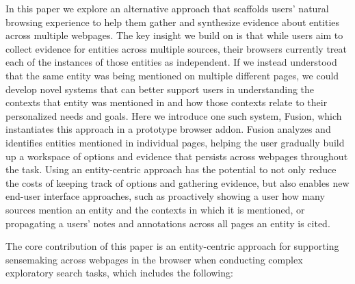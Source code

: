 In this paper we explore an alternative approach that scaffolds users' natural browsing experience to help them gather and synthesize evidence about entities across multiple webpages. The key insight we build on is that while users aim to collect evidence for entities across multiple sources, their browsers currently treat each of the instances of those entities as independent. If we instead understood that the same entity was being mentioned on multiple different pages, we could develop novel systems that can better support users in understanding the contexts that entity was mentioned in and how those contexts relate to their personalized needs and goals. Here we introduce one such system, Fusion, which instantiates this approach in a prototype browser addon. Fusion analyzes and identifies entities mentioned in individual pages, helping the user gradually build up a workspace of options and evidence that persists across webpages throughout the task. Using an entity-centric approach has the potential to not only reduce the costs of keeping track of options and gathering evidence, but also enables new end-user interface approaches, such as proactively showing a user how many sources mention an entity and the contexts in which it is mentioned, or propagating a users' notes and annotations across all pages an entity is cited.

The core contribution of this paper is an entity-centric approach for supporting sensemaking across webpages in the browser when conducting complex exploratory search tasks, which includes the following:

